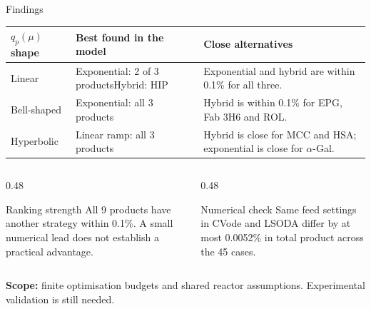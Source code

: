 \documentclass[aspectratio=169, 11pt]{beamer}
\begin{document}
\begin{frame}{Findings}
  \begin{center}
    \renewcommand{\arraystretch}{1.35}
    {\small\begin{tabular}{p{2.2cm}p{5.0cm}p{5.0cm}}
      \toprule
      \textbf{$q_p(\mu)$ shape} & \textbf{Best found in the model} & \textbf{Close alternatives} \\
      \midrule
      Linear & Exponential: 2 of 3 products\newline Hybrid: HIP & Exponential and hybrid are within 0.1\% for all three. \\
      Bell-shaped & Exponential: all 3 products & Hybrid is within 0.1\% for EPG, Fab 3H6 and ROL. \\
      Hyperbolic & Linear ramp: all 3 products & Hybrid is close for MCC and HSA; exponential is close for $\alpha$-Gal. \\
      \bottomrule
    \end{tabular}}
  \end{center}
  \vspace{0.1cm}
  \begin{columns}[T]
    \begin{column}{0.48\textwidth}
      \begin{block}{Ranking strength}
        {\small All 9 products have another strategy within 0.1\%.
        A small numerical lead does not establish a practical advantage.}
      \end{block}
    \end{column}
    \begin{column}{0.48\textwidth}
      \begin{block}{Numerical check}
        {\small Same feed settings in CVode and LSODA differ by at most
        0.0052\% in total product across the 45 cases.}
      \end{block}
    \end{column}
  \end{columns}
  \vspace{0.1cm}
  {\small \textbf{Scope:} finite optimisation budgets and shared reactor assumptions.
  Experimental validation is still needed.}
\end{frame}
\end{document}
